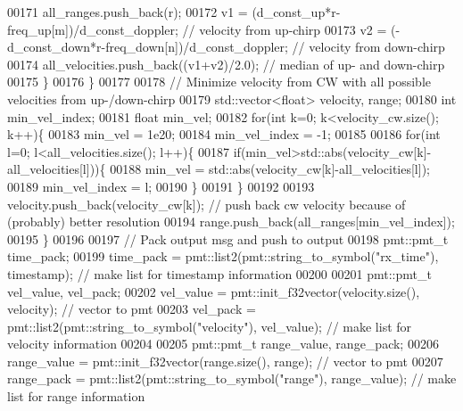 \begin{DoxyCode}
00171                 all\_ranges.push\_back(r);
00172                 v1 = (d_const_up*r-freq\_up[m])/d_const_doppler; \textcolor{comment}{// velocity from up-chirp}
00173                 v2 = (-d_const_down*r-freq\_down[n])/d_const_doppler; \textcolor{comment}{// velocity from down-chirp}
00174                 all\_velocities.push\_back((v1+v2)/2.0); \textcolor{comment}{// median of up- and down-chirp}
00175             \}
00176         \}
00177         
00178         \textcolor{comment}{// Minimize velocity from CW with all possible velocities from up-/down-chirp}
00179         std::vector<float> velocity, range;
00180         \textcolor{keywordtype}{int} min\_vel\_index;
00181         \textcolor{keywordtype}{float} min\_vel;
00182         \textcolor{keywordflow}{for}(\textcolor{keywordtype}{int} k=0; k<velocity\_cw.size(); k++)\{
00183             min\_vel = 1e20;
00184             min\_vel\_index = -1;
00185             
00186             \textcolor{keywordflow}{for}(\textcolor{keywordtype}{int} l=0; l<all\_velocities.size(); l++)\{
00187                 \textcolor{keywordflow}{if}(min\_vel>std::abs(velocity\_cw[k]-all\_velocities[l]))\{
00188                     min\_vel = std::abs(velocity\_cw[k]-all\_velocities[l]);
00189                     min\_vel\_index = l;
00190                 \}
00191             \}
00192             
00193             velocity.push\_back(velocity\_cw[k]); \textcolor{comment}{// push back cw velocity because of (probably) better
       resolution}
00194             range.push\_back(all\_ranges[min\_vel\_index]);
00195         \}
00196         
00197         \textcolor{comment}{// Pack output msg and push to output}
00198         pmt::pmt\_t time\_pack;
00199         time\_pack = pmt::list2(pmt::string\_to\_symbol(\textcolor{stringliteral}{"rx\_time"}), timestamp); \textcolor{comment}{// make list for timestamp
       information}
00200         
00201         pmt::pmt\_t vel\_value, vel\_pack;
00202         vel\_value = pmt::init\_f32vector(velocity.size(), velocity); \textcolor{comment}{// vector to pmt}
00203         vel\_pack = pmt::list2(pmt::string\_to\_symbol(\textcolor{stringliteral}{"velocity"}), vel\_value); \textcolor{comment}{// make list for velocity
       information}
00204         
00205         pmt::pmt\_t range\_value, range\_pack;
00206         range\_value = pmt::init\_f32vector(range.size(), range); \textcolor{comment}{// vector to pmt}
00207         range\_pack = pmt::list2(pmt::string\_to\_symbol(\textcolor{stringliteral}{"range"}), range\_value); \textcolor{comment}{// make list for range
       information}

\end{DoxyCode}
